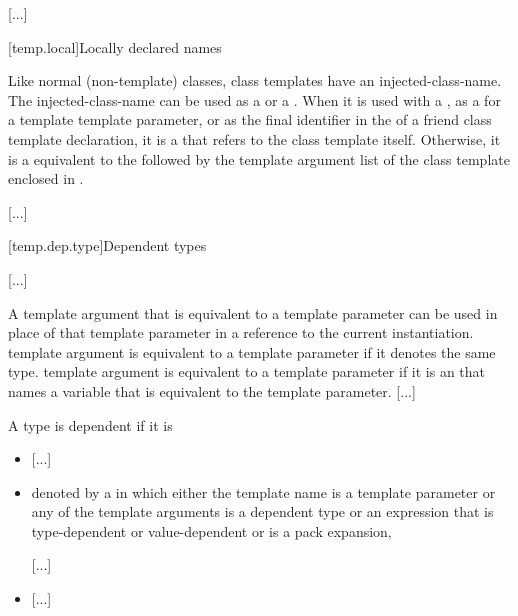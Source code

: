 \documentclass{wg21}
\begin{document}
\begin{bnf}
    \br
    \br
     \terminal{<}  \terminal{>}
\end{bnf}

\textcolor{noteclr}{[...]}


[temp.local]{Locally declared names}

\pnum
Like normal (non-template) classes, class templates have an
injected-class-name.
The
injected-class-name can be used
as a  or a .
When it is used with a
,
as a  for a  template template parameter,
or as the final identifier in the  of
a friend class template declaration,
it is a  that refers to the
class template itself.
Otherwise, it is a 
equivalent to the 
followed by
the template argument list
of the class template
enclosed in \tcode{<>}.

\textcolor{noteclr}{[...]}

[temp.dep.type]{Dependent types}

\textcolor{noteclr}{[...]}

\pnum
A template argument that is equivalent to a template
parameter can be used in place of that
template parameter in a reference to the current instantiation.
 template argument is equivalent to a  template parameter
if it denotes the same type.
 template argument is equivalent to a  template parameter
if it is an  that names a variable
that is equivalent to the template parameter.
\textcolor{noteclr}{[...]}


\pnum
A type is dependent if it is
\begin{itemize}
\item
\textcolor{noteclr}{[...]}
\item
denoted by a 
in which either the template name is a template parameter or any of the
template arguments  is a dependent type or an expression that is type-dependent
or value-dependent or is a pack expansion,
\begin{wfootnote}
    \textcolor{noteclr}{[...]}
\end{wfootnote}
\item \textcolor{noteclr}{[...]}
\end{itemize}
\end{document}
